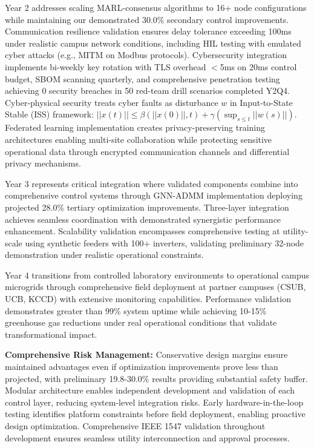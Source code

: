 \documentclass[12pt]{article}
\begin{document}
Year 2 addresses scaling MARL-consensus algorithms to 16+ node configurations while maintaining our demonstrated 30.0\% secondary control improvements. Communication resilience validation ensures delay tolerance exceeding 100ms under realistic campus network conditions, including HIL testing with emulated cyber attacks (e.g., MITM on Modbus protocols). Cybersecurity integration implements bi-weekly key rotation with TLS overhead $<$5ms on 20ms control budget, SBOM scanning quarterly, and comprehensive penetration testing achieving 0 security breaches in 50 red-team drill scenarios completed Y2Q4. Cyber-physical security treats cyber faults as disturbance $w$ in Input-to-State Stable (ISS) framework: $||x(t)|| \leq \beta(||x(0)||, t) + \gamma(\sup_{s \leq t} ||w(s)||)$. Federated learning implementation creates privacy-preserving training architectures enabling multi-site collaboration while protecting sensitive operational data through encrypted communication channels and differential privacy mechanisms.

Year 3 represents critical integration where validated components combine into comprehensive control systems through GNN-ADMM implementation deploying projected 28.0\% tertiary optimization improvements. Three-layer integration achieves seamless coordination with demonstrated synergistic performance enhancement. Scalability validation encompasses comprehensive testing at utility-scale using synthetic feeders with 100+ inverters, validating preliminary 32-node demonstration under realistic operational constraints.

Year 4 transitions from controlled laboratory environments to operational campus microgrids through comprehensive field deployment at partner campuses (CSUB, UCB, KCCD) with extensive monitoring capabilities. Performance validation demonstrates greater than 99\% system uptime while achieving 10-15\% greenhouse gas reductions under real operational conditions that validate transformational impact.

\textbf{Comprehensive Risk Management:} Conservative design margins ensure maintained advantages even if optimization improvements prove less than projected, with preliminary 19.8-30.0\% results providing substantial safety buffer. Modular architecture enables independent development and validation of each control layer, reducing system-level integration risks. Early hardware-in-the-loop testing identifies platform constraints before field deployment, enabling proactive design optimization. Comprehensive IEEE 1547 validation \cite{ieee1547} throughout development ensures seamless utility interconnection and approval processes.
\end{document}
